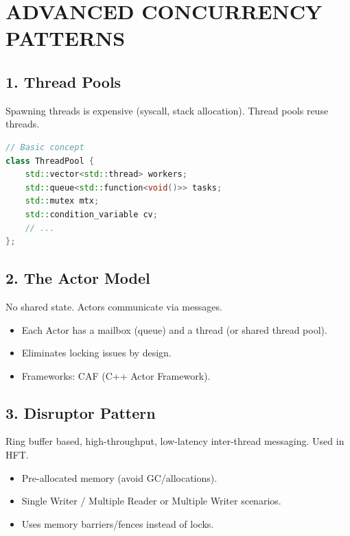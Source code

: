 \hypertarget{advanced-concurrency-patterns}{%
\chapter{ADVANCED CONCURRENCY
PATTERNS}\label{advanced-concurrency-patterns}}

\hypertarget{thread-pools}{%
\section{1. Thread Pools}\label{thread-pools}}

Spawning threads is expensive (syscall, stack allocation). Thread pools
reuse threads.

\begin{lstlisting}[language={C++}]
// Basic concept
class ThreadPool {
    std::vector<std::thread> workers;
    std::queue<std::function<void()>> tasks;
    std::mutex mtx;
    std::condition_variable cv;
    // ...
};
\end{lstlisting}

\hypertarget{the-actor-model}{%
\section{2. The Actor Model}\label{the-actor-model}}

No shared state. Actors communicate via messages.

\begin{itemize}
\tightlist
\item
  Each Actor has a mailbox (queue) and a thread (or shared thread pool).
\item
  Eliminates locking issues by design.
\item
  Frameworks: CAF (C++ Actor Framework).
\end{itemize}

\hypertarget{disruptor-pattern}{%
\section{3. Disruptor Pattern}\label{disruptor-pattern}}

Ring buffer based, high-throughput, low-latency inter-thread messaging.
Used in HFT.

\begin{itemize}
\tightlist
\item
  Pre-allocated memory (avoid GC/allocations).
\item
  Single Writer / Multiple Reader or Multiple Writer scenarios.
\item
  Uses memory barriers/fences instead of locks.
\end{itemize}

